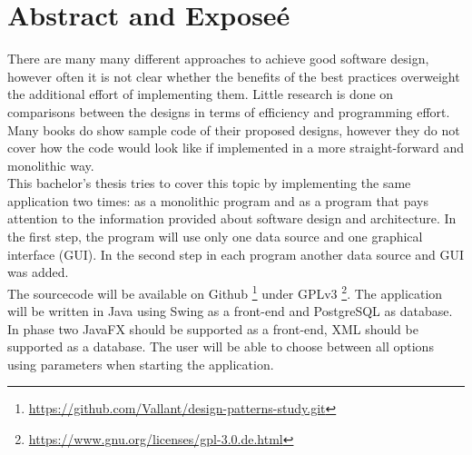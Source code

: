 \chapter{Abstract and Exposeé}

 There are many many different approaches to achieve good software design, however often it is not clear whether the benefits of the best practices overweight the additional effort of implementing them. Little research is done on comparisons between the designs in terms of efficiency and programming effort. Many books do show sample code of their proposed designs, however they do not cover how the code would look like if implemented in a more straight-forward and monolithic way.\\

This bachelor's thesis tries to cover this topic by implementing the same application two times: as a monolithic program and as a program that pays attention to the information provided about software design and architecture. In the first step, the program will use only one data source and one graphical interface (GUI). In the second step in each program another data source and GUI was added. \\

The sourcecode will be available on Github \footnote{\href{https://github.com/Vallant/design-patterns-study.git}{https://github.com/Vallant/design-patterns-study.git}} under GPLv3 \footnote{\href{https://www.gnu.org/licenses/gpl-3.0.de.html}{https://www.gnu.org/licenses/gpl-3.0.de.html}}. The application will be written in Java using Swing as a front-end and PostgreSQL as database. In phase two JavaFX should be supported as a front-end, XML should be supported as a database. The user will be able to choose between all options using parameters when starting the application.
